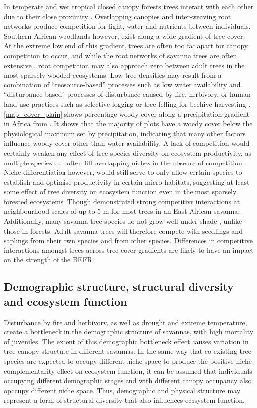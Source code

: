 \begin{refsection}
In temperate and wet tropical closed canopy forests trees interact with each other due to their close proximity \citep{Coomes2007a, Purves2007}. Overlapping canopies and inter-weaving root networks produce competition for light, water and nutrients between individuals. Southern African woodlands however, exist along a wide gradient of tree cover. At the extreme low end of this gradient, trees are often too far apart for canopy competition to occur, and while the root networks of savanna trees are often extensive \citep{Belsky1994}, root competition may also approach zero between adult trees in the most sparsely wooded ecosystems. Low tree densities may result from a combination of ``reosource-based'' processes such as low water availability and ``disturbance-based'' processes of disturbance caused by fire, herbivory, or human land use practices such as selective logging or tree felling for beehive harvesting \citep{Ryan2016}. \autoref{map_cover_plain} shows percentage woody cover along a precipitation gradient in Africa from \citet{Sankaran2005}. It shows that the majority of plots have a woody cover below the physiological maximum set by precipitation, indicating that many other factors influence woody cover other than water availability. A lack of competition would certainly weaken any effect of tree species diversity on ecosystem productivity, as multiple species can often fill overlapping niches in the absence of competition. Niche differentiation however, would still serve to only allow certain species to establish and optimise productivity in certain micro-habitats, suggesting at least some effect of tree diversity on ecosystem function even in the most sparsely forested ecosystems. Though \citet{Dohn2017} demonstrated strong competitive interactions at neighbourhood scales of up to 5 m for most trees in an East African savanna. Additionally, many savanna tree species do not grow well under shade \citep{Belsky1994}, unlike those in forests. Adult savanna trees will therefore compete with seedlings and saplings from their own species and from other species. Differences in competitive interactions amongst trees across tree cover gradients are likely to have an impact on the strength of the BEFR. 

\subsection{Demographic structure, structural diversity and ecosystem function}

Disturbance by fire and herbivory, as well as drought and extreme temperature, create a bottleneck in the demographic structure of savannas, with high mortality of juveniles. The extent of this demographic bottleneck effect causes variation in tree canopy structure in different savannas. In the same way that co-existing tree species are expected to occupy different niche space to produce the positive niche complementarity effect on ecosystem function, it can be assumed that individuals occupying different demographic stages and with different canopy occupancy also opccupy different niche space. Thus, demographic and physical structure may represent a form of structural diversity that also influences ecosystem function.


\end{refsection}
